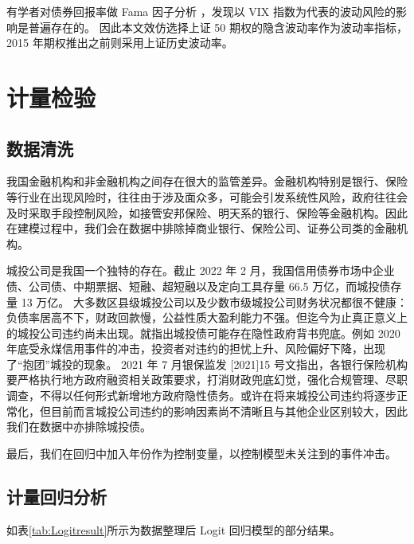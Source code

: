 有学者对债券回报率做 Fama 因子分析
\cite{chung2019volatility}
，发现以 VIX 指数为代表的波动风险的影响是普遍存在的。
因此本文效仿选择上证 50 期权的隐含波动率作为波动率指标，2015 年期权推出之前则采用上证历史波动率。

\section{计量检验}
\subsection{数据清洗}

我国金融机构和非金融机构之间存在很大的监管差异。金融机构特别是银行、保险等行业在出现风险时，往往由于涉及面众多，可能会引发系统性风险，政府往往会及时采取手段控制风险，如接管安邦保险、明天系的银行、保险等金融机构。因此在建模过程中，我们会在数据中排除掉商业银行、保险公司、证券公司类的金融机构。

城投公司是我国一个独特的存在。截止 2022 年 2 月，我国信用债券市场中企业债、公司债、中期票据、短融、超短融以及定向工具存量 66.5 万亿，而城投债存量 13 万亿。
大多数区县级城投公司以及少数市级城投公司财务状况都很不健康：负债率居高不下，财政回款慢，公益性质大盈利能力不强。但迄今为止真正意义上的城投公司违约尚未出现。\Textcite{钟辉勇2016城投债的担保可信吗}就指出城投债可能存在隐性政府背书兜底。例如 2020 年底受永煤信用事件的冲击，投资者对违约的担忧上升、风险偏好下降，出现了“抱团”城投的现象。
2021 年 7 月银保监发 [2021]15 号文指出，各银行保险机构要严格执行地方政府融资相关政策要求，打消财政兜底幻觉，强化合规管理、尽职调查，不得以任何形式新增地方政府隐性债务。或许在将来城投公司违约将逐步正常化，但目前而言城投公司违约的影响因素尚不清晰且与其他企业区别较大，因此我们在数据中亦排除城投债。

最后，我们在回归中加入年份作为控制变量，以控制模型未关注到的事件冲击。

\subsection{计量回归分析}
如表\ref{tab:Logitresult}所示为数据整理后 Logit 回归模型的部分结果。

